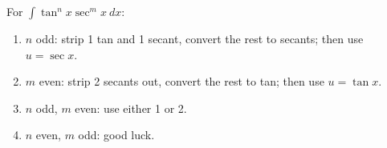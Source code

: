 \documentclass[main.tex]{subfiles}
\begin{document}
\begin{multicols}{2}
	For \(\displaystyle \int \tan^n{x} \sec^m{x} \ dx\):
	\begin{enumerate}
	\item \(n\) odd: strip 1 tan and 1 secant, convert the rest to secants; then use \(u = \sec{x}\).
	\item \(m\) even: strip 2 secants out, convert the rest to tan; then use \(u = \tan{x}\).
	\item \(n\) odd, \(m\) even: use either 1 or 2.
	\item \(n\) even, \(m\) odd: good luck.
	\end{enumerate}

\end{multicols}
\end{document}
